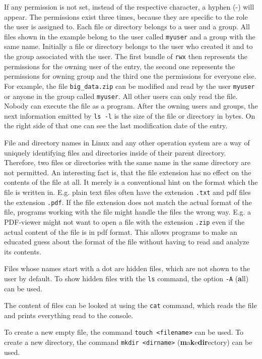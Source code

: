 If any permission is not set, instead of the respective character, a hyphen (-) will appear. The permissions exist three times, because they are specific to the role the user is assigned to. Each file or directory belongs to a user and a group. All files shown in the example belong to the user called \lstinline{myuser} and a group with the same name. Initially a file or directory belongs to the user who created it and to the group associated with the user. The first bundle of \lstinline{rwx} then represents the permissions for the owning user of the entry, the second one represents the permissions for owning group and the third one the permissions for everyone else. For example, the file \lstinline{big_data.zip} can be modified and read by the user \lstinline{myuser} or anyone in the group called \lstinline{myuser}. All other users can only read the file. Nobody can execute the file as a program. After the owning users and groups, the next information emitted by \lstinline{ls -l} is the size of the file or directory in bytes. On the right side of that one can see the last modification date of the entry.

File and directory names in Linux and any other operation system are a way of uniquely identifying files and directories inside of their parent directory. Therefore, two files or directories with the same name in the same directory are not permitted. An interesting fact is, that the file extension has no effect on the contents of the file at all. It merely is a conventional hint on the format which the file is written in. E.g. plain text files often have the extension \lstinline{.txt} and pdf files the extension \lstinline{.pdf}. If the file extension does not match the actual format of the file, programs working with the file might handle the files the wrong way. E.g. a PDF-viewer might not want to open a file with the extension \lstinline{.zip} even if the actual content of the file is in pdf format. This allows programs to make an educated guess about the format of the file without having to read and analyze its contents.

Files whose names start with a dot are hidden files, which are not shown to the user by default. To show hidden files with the \lstinline{ls} command, the option \lstinline{-A} (\textbf{a}ll) can be used.

The content of files can be looked at using the \lstinline{cat} command, which reads the file and prints everything read to the console.

To create a new empty file, the command \lstinline{touch <filename>} can be used. To create a new directory, the command \lstinline{mkdir <dirname>} (\textbf{m}a\textbf{k}e\textbf{dir}ectory) can be used.

